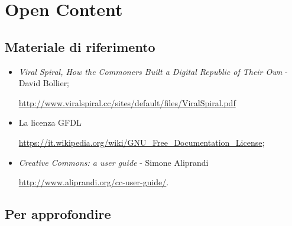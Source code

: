 \chapter{Open Content}

\section*{Materiale di riferimento}

\begin{itemize}

\item \textit{Viral Spiral, How the Commoners Built a Digital Republic of Their Own} - David Bollier;

\url{http://www.viralspiral.cc/sites/default/files/ViralSpiral.pdf}

\item La licenza GFDL 

\url{https://it.wikipedia.org/wiki/GNU_Free_Documentation_License};
\item \textit{Creative Commons: a user guide} - Simone Aliprandi

 \url{http://www.aliprandi.org/cc-user-guide/}.
\end{itemize}

\section*{Per approfondire}

